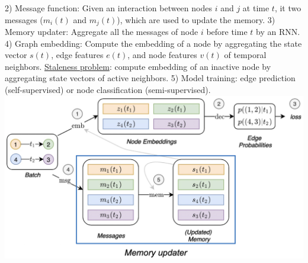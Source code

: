2) Message function: Given an interaction between nodes $i$ and $j$ at time $t$, it two messages ($m_i(t)$ and $m_j(t)$), which are used to update the memory.
3) Memory updater: Aggregate all the messages of node $i$ before time $t$ by an RNN.
4) Graph embedding: Compute the embedding of a node by aggregating the state vector $s(t)$, edge features $e(t)$, and node features $v(t)$ of temporal neighbors. \underline{Staleness problem}: compute embedding of an inactive node by aggregating state vectors of active neighbors.
5) Model training: edge prediction (self-supervised) or node classification (semi-supervised).
\includegraphics[height=0.07\textwidth]{figs/TGN.png}

%
%

